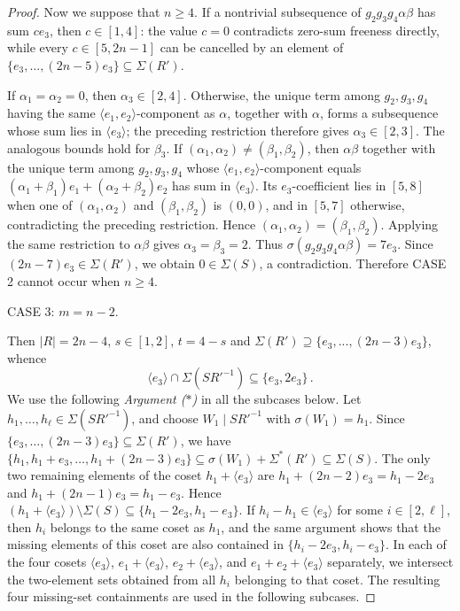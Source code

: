 \documentclass[a4paper, 10pt]{amsart}
\theoremstyle{plain}
\theoremstyle{definition}
\numberwithin{equation}{section}
\begin{document}
{\begin{proof}
Now we  suppose that $n\ge4$. 
If a nontrivial subsequence of $g_2g_3g_4\alpha\beta$ has sum $ce_3$, then $c\in[1,4]$: the value $c=0$ contradicts zero-sum freeness directly, while every $c\in[5,2n-1]$ can be cancelled by an element of $\{e_3,\ldots,(2n-5)e_3\}\subseteq\Sigma(R')$.



If $\alpha_1=\alpha_2=0$, then $\alpha_3\in[2,4]$. Otherwise, the unique term among $g_2,g_3,g_4$ having the same $\langle e_1,e_2\rangle$-component as $\alpha$, together with $\alpha$, forms a subsequence whose sum lies in $\langle e_3\rangle$; the preceding restriction therefore gives $\alpha_3\in[2,3]$. The analogous bounds hold for $\beta_3$. If $(\alpha_1,\alpha_2)\ne(\beta_1,\beta_2)$, then $\alpha\beta$ together with the unique term among $g_2,g_3,g_4$ whose $\langle e_1,e_2\rangle$-component equals $(\alpha_1+\beta_1)e_1+(\alpha_2+\beta_2)e_2$ has sum in $\langle e_3\rangle$. Its $e_3$-coefficient lies in $[5,8]$ when one of $(\alpha_1,\alpha_2)$ and $(\beta_1,\beta_2)$ is $(0,0)$, and in $[5,7]$ otherwise, contradicting the preceding restriction. Hence $(\alpha_1,\alpha_2)=(\beta_1,\beta_2)$. Applying the same restriction to $\alpha\beta$ gives $\alpha_3=\beta_3=2$.
Thus $\sigma(g_2g_3g_4\alpha\beta)=7e_3$. Since $(2n-7)e_3\in\Sigma(R')$, we obtain $0\in\Sigma(S)$, a contradiction. Therefore CASE 2 cannot occur when $n\ge4$.
	
\smallskip
\noindent
CASE 3:  $m=n-2$. 
	
Then $|R|=2n-4$, $s\in[1,2]$, $t=4-s$ and $\Sigma(R')\supseteq \{e_3,...,(2n-3)e_3\}$, whence  
\[
\langle e_3\rangle \cap \Sigma (SR'^{-1}) \subseteq \{ e_3,2e_3\} \,.
\]
We use the following {\it Argument ($*$)} in all the subcases below. Let $h_1,\ldots,h_\ell\in\Sigma(SR'^{-1})$, and choose $W_1\mid SR'^{-1}$ with $\sigma(W_1)=h_1$. Since $\{e_3,\ldots,(2n-3)e_3\}\subseteq\Sigma(R')$, we have $\{h_1,h_1+e_3,\ldots,h_1+(2n-3)e_3\}\subseteq\sigma(W_1)+\Sigma^*(R')\subseteq\Sigma(S)$. The only two remaining elements of the coset $h_1+\langle e_3\rangle$ are $h_1+(2n-2)e_3=h_1-2e_3$ and $h_1+(2n-1)e_3=h_1-e_3$. Hence $(h_1+\langle e_3\rangle)\setminus\Sigma(S)\subseteq\{h_1-2e_3,h_1-e_3\}$. 
If $h_i-h_1\in\langle e_3\rangle$ for some $i\in[2,\ell]$, then $h_i$ belongs to the same coset as $h_1$, and the same argument shows that the missing elements of this coset are also contained in $\{h_i-2e_3,h_i-e_3\}$. In each of the four cosets $\langle e_3\rangle$, $e_1+\langle e_3\rangle$, $e_2+\langle e_3\rangle$, and $e_1+e_2+\langle e_3\rangle$ separately, we intersect the two-element sets obtained from all $h_i$ belonging to that coset. The resulting four missing-set containments are used in the following subcases.
	



\end{proof}}
\end{document}
